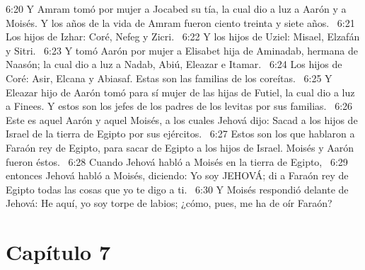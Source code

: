 6:20 Y Amram tomó por mujer a Jocabed su tía, la cual dio a luz a Aarón y a Moisés. Y los años de la vida de Amram fueron ciento treinta y siete años.  
6:21 Los hijos de Izhar: Coré, Nefeg y Zicri.  
6:22 Y los hijos de Uziel: Misael, Elzafán y Sitri.  
6:23 Y tomó Aarón por mujer a Elisabet hija de Aminadab, hermana de Naasón; la cual dio a luz a Nadab, Abiú, Eleazar e Itamar.  
6:24 Los hijos de Coré: Asir, Elcana y Abiasaf. Estas son las familias de los coreítas.  
6:25 Y Eleazar hijo de Aarón tomó para sí mujer de las hijas de Futiel, la cual dio a luz a Finees. Y estos son los jefes de los padres de los levitas por sus familias.  
6:26 Este es aquel Aarón y aquel Moisés, a los cuales Jehová dijo: Sacad a los hijos de Israel de la tierra de Egipto por sus ejércitos.  
6:27 Estos son los que hablaron a Faraón rey de Egipto, para sacar de Egipto a los hijos de Israel. Moisés y Aarón fueron éstos.  
6:28 Cuando Jehová habló a Moisés en la tierra de Egipto,  
6:29 entonces Jehová habló a Moisés, diciendo: Yo soy JEHOVÁ; di a Faraón rey de Egipto todas las cosas que yo te digo a ti.  
6:30 Y Moisés respondió delante de Jehová: He aquí, yo soy torpe de labios; ¿cómo, pues, me ha de oír Faraón?  
\section*{Capítulo 7 }

